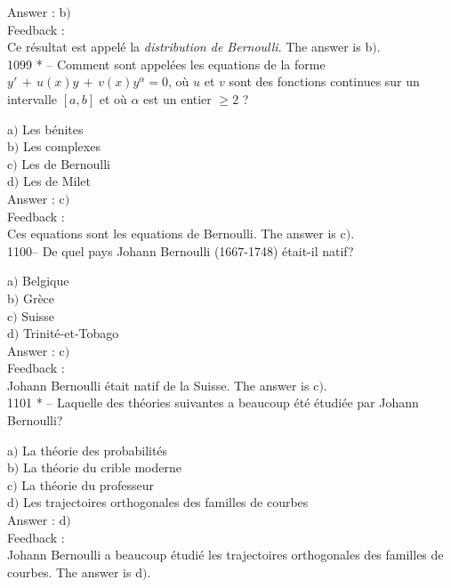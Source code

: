 ﻿\documentclass[letterpaper, 12pt]{article}
\begin{document}
Answer : b$)$\\

Feedback : \\
Ce r\'esultat est appel\'e la {\sl distribution de Bernoulli}.
The answer is b$)$.\\

1099 * -- Comment sont appel\'ees les equations de la forme
$y'\,+\,u(x)y\,+\,v(x)y^{\alpha}=0$, o\`u $u$ et $v$ sont des
fonctions continues sur un intervalle $[a,b]$ et o\`u $\alpha$ est
un entier $\ge2$ ?

a$)$ Les {\slequations b\'enites} \\
b$)$ Les {\slequations complexes}  \\
c$)$ Les {\slequations de Bernoulli}  \\
d$)$ Les {\slequations de Milet}\\

Answer : c$)$\\

Feedback : \\
Ces equations sont les equations de Bernoulli.
The answer is c$)$.\\

1100-- De quel pays Johann Bernoulli (1667-1748) \'etait-il natif?

a$)$ Belgique \\
b$)$ Gr\`ece  \\
c$)$ Suisse  \\
d$)$ Trinit\'e-et-Tobago \\

Answer : c$)$\\

Feedback : \\
Johann Bernoulli \'etait natif de la Suisse.
The answer is c$)$.\\

1101 * -- Laquelle des th\'eories suivantes a beaucoup \'et\'e
\'etudi\'ee par Johann Bernoulli?

a$)$ La th\'eorie des probabilit\'es \\
b$)$ La th\'eorie du crible moderne  \\
c$)$ La th\'eorie du professeur  \\
d$)$ Les trajectoires orthogonales des familles de courbes\\

Answer : d$)$\\

Feedback : \\
Johann Bernoulli a beaucoup \'etudi\'e les trajectoires orthogonales
des familles de courbes.
The answer is d$)$.\\
\end{document}
